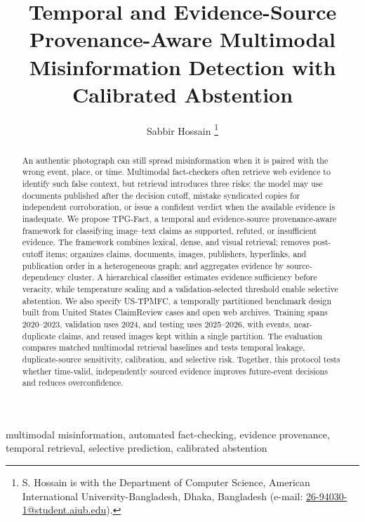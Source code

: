 \documentclass[journal]{IEEEtran}
\title{Temporal and Evidence-Source Provenance-Aware Multimodal Misinformation Detection with Calibrated Abstention}
\author{Sabbir Hossain%
\thanks{S. Hossain is with the Department of Computer Science, American International University-Bangladesh, Dhaka, Bangladesh (e-mail: \href{mailto:26-94030-1@student.aiub.edu}{26-94030-1@student.aiub.edu}).}}
\newcommand{\systemname}{TPG-Fact}
\newcommand{\datasetname}{US-TPMFC}
\begin{document}
\maketitle

\begin{abstract}
An authentic photograph can still spread misinformation when it is paired with the wrong event, place, or time. Multimodal fact-checkers often retrieve web evidence to identify such false context, but retrieval introduces three risks: the model may use documents published after the decision cutoff, mistake syndicated copies for independent corroboration, or issue a confident verdict when the available evidence is inadequate. We propose \systemname{}, a temporal and evidence-source provenance-aware framework for classifying image--text claims as supported, refuted, or insufficient evidence. The framework combines lexical, dense, and visual retrieval; removes post-cutoff items; organizes claims, documents, images, publishers, hyperlinks, and publication order in a heterogeneous graph; and aggregates evidence by source-dependency cluster. A hierarchical classifier estimates evidence sufficiency before veracity, while temperature scaling and a validation-selected threshold enable selective abstention. We also specify \datasetname{}, a temporally partitioned benchmark design built from United States ClaimReview cases and open web archives. Training spans 2020--2023, validation uses 2024, and testing uses 2025--2026, with events, near-duplicate claims, and reused images kept within a single partition. The evaluation compares matched multimodal retrieval baselines and tests temporal leakage, duplicate-source sensitivity, calibration, and selective risk. Together, this protocol tests whether time-valid, independently sourced evidence improves future-event decisions and reduces overconfidence.
\end{abstract}

\begin{IEEEkeywords}
multimodal misinformation, automated fact-checking, evidence provenance, temporal retrieval, selective prediction, calibrated abstention
\end{IEEEkeywords}












\end{document}
